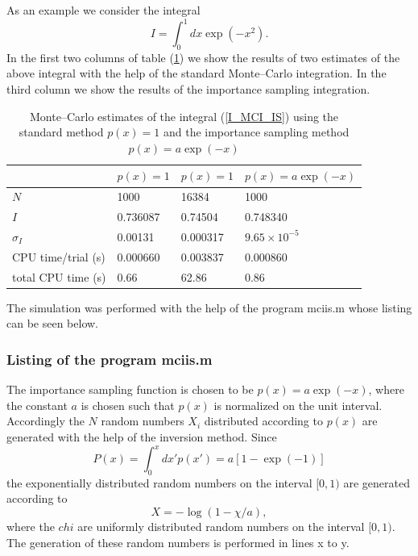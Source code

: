 As an example we consider the integral
\begin{equation}
\label{I_MCI_IS}
I= \int_0^1 dx \exp(-x^2).
\end{equation}
In the first two columns of table (\ref{T_MCI_IS}) we show
the results of two estimates of the above integral with the 
help of the standard Monte--Carlo integration. In the third column 
we show the results of the importance sampling integration.

\begin{table}\label{T_MCI_IS}
\caption{Monte--Carlo estimates of the integral (\ref{I_MCI_IS})
using the standard method $p(x)=1$ and the importance sampling method
$p(x)=a\exp(-x)$}
\begin{center}
\begin{tabular}{llll}
 ~             & $p(x) =1$ & $p(x) =1$ & $p(x)=a\exp(-x)$ \\ \hline
$N$            & 1000      & 16384      & 1000           \\
$I$            & 0.736087  & 0.74504    & 0.748340        \\
$\sigma_I$     & 0.00131   & 0.000317   & $9.65 \times 10^{-5}$ \\
CPU time/trial (s) & 0.000660  & 0.003837   & 0.000860  \\
total CPU time (s) & 0.66      & 62.86      & 0.86 
\end{tabular}
\end{center}
\end{table}
The simulation was performed with the help of the program
{\sf mciis.m} whose listing can be seen below.

\subsubsection{Listing of the program mciis.m}

The importance sampling function is chosen to be $p(x)=a\exp(-x)$,
where the constant $a$ is chosen such that $p(x)$ is normalized
on the  unit interval. Accordingly the $N$ random numbers $X_i$
distributed according to $p(x)$ are generated with the help of the
inversion method. Since
\begin{equation*}
P(x) = \int_0^x dx' p(x') = a[1-\exp(-1)]
\end{equation*}
the exponentially distributed random numbers on the interval $[0,1)$
are generated according to
\begin{equation*}
X = - \log(1- \chi/a),
\end{equation*}
where the $chi$ are uniformly distributed random numbers on the 
interval $[0,1)$. The generation of these random numbers is 
performed in lines x to y.

